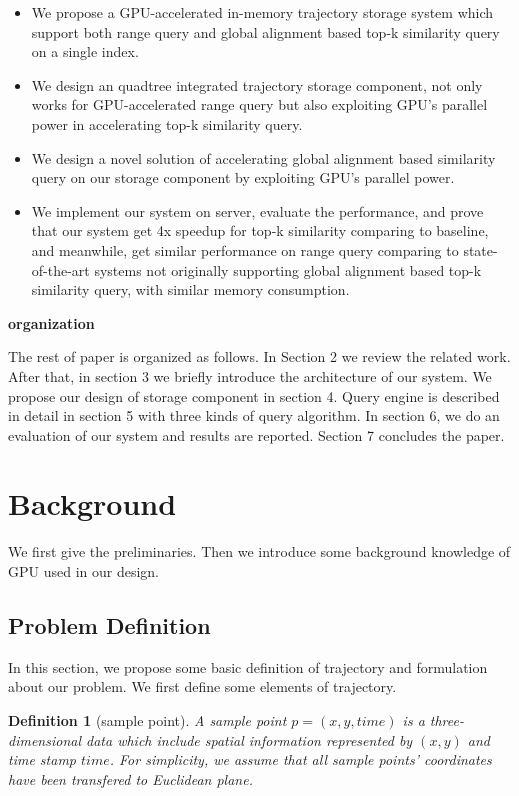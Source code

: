 \documentclass[conference]{IEEEtran}
\begin{document}
\begin{itemize}
	\item We propose a GPU-accelerated in-memory trajectory storage system which support both range query and global alignment based top-k similarity query on a single index.
	\item We design an quadtree integrated trajectory storage component, not only works for GPU-accelerated range query but also exploiting GPU's parallel power in accelerating top-k similarity query.
	\item We design a novel solution of accelerating global alignment based similarity query on our storage component by exploiting GPU's parallel power.
	\item We implement our system on server, evaluate the performance, and prove that our system get 4x speedup for top-k similarity comparing to baseline, and meanwhile, get similar performance on range query comparing to state-of-the-art systems not originally supporting global alignment based top-k similarity query, with similar memory consumption.
\end{itemize}
	 
\textbf{organization}

	The rest of paper is organized as follows. In Section 2 we review the related work. After that, in section 3 we briefly introduce the architecture of our system. We propose our design of storage component in section 4. Query engine is described in detail in section 5 with three kinds of query algorithm. In section 6, we do an evaluation of our system and results are reported. Section 7 concludes the paper. 



\section{Background}
We first give the preliminaries.
Then we introduce some background knowledge of GPU used in our design.

\subsection{Problem Definition}
	In this section, we propose some basic definition of trajectory and formulation about our problem. We first define some elements of trajectory.
	
	\newtheorem{define}{Definition}
	\begin{define}[sample point]
		A sample point $p=(x,y,time)$ is a three-dimensional data which include spatial information represented by $(x,y)$ and time stamp $time$. For simplicity, we assume that all sample points' coordinates have been transfered to Euclidean plane.
	\end{define}
\end{document}
